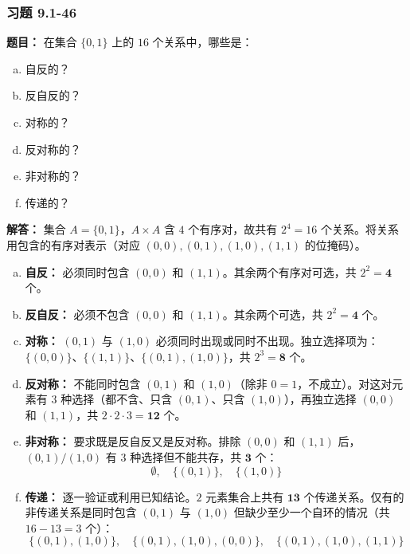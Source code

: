 \documentclass[11pt,UTF8]{article}
\begin{document}
\subsubsection*{习题 9.1-46}
\textbf{题目：} 在集合 $\{0, 1\}$ 上的 $16$ 个关系中，哪些是：
\begin{enumerate}[a)]
    \item 自反的？ \item 反自反的？ \item 对称的？ \item 反对称的？ \item 非对称的？ \item 传递的？
\end{enumerate}

\textbf{解答：}
集合 $A=\{0,1\}$，$A \times A$ 含 $4$ 个有序对，故共有 $2^4=16$ 个关系。将关系用包含的有序对表示（对应 $(0,0),(0,1),(1,0),(1,1)$ 的位掩码）。

\begin{enumerate}[a)]
    \item \textbf{自反：} 必须同时包含 $(0,0)$ 和 $(1,1)$。其余两个有序对可选，共 $2^2 = \mathbf{4}$ 个。
    
    \item \textbf{反自反：} 必须不包含 $(0,0)$ 和 $(1,1)$。其余两个可选，共 $2^2 = \mathbf{4}$ 个。
    
    \item \textbf{对称：} $(0,1)$ 与 $(1,0)$ 必须同时出现或同时不出现。独立选择项为：$\{(0,0)\}$、$\{(1,1)\}$、$\{(0,1),(1,0)\}$，共 $2^3 = \mathbf{8}$ 个。
    
    \item \textbf{反对称：} 不能同时包含 $(0,1)$ 和 $(1,0)$（除非 $0=1$，不成立）。对这对元素有 $3$ 种选择（都不含、只含 $(0,1)$、只含 $(1,0)$），再独立选择 $(0,0)$ 和 $(1,1)$，共 $2 \cdot 2 \cdot 3 = \mathbf{12}$ 个。
    
    \item \textbf{非对称：} 要求既是反自反又是反对称。排除 $(0,0)$ 和 $(1,1)$ 后，$(0,1)/(1,0)$ 有 $3$ 种选择但不能共存，共 $\mathbf{3}$ 个：
    \[ \emptyset,\quad \{(0,1)\},\quad \{(1,0)\} \]
    
    \item \textbf{传递：} 逐一验证或利用已知结论。$2$ 元素集合上共有 $\mathbf{13}$ 个传递关系。仅有的非传递关系是同时包含 $(0,1)$ 与 $(1,0)$ 但缺少至少一个自环的情况（共 $16-13=3$ 个）：
    \[ \{(0,1),(1,0)\},\quad \{(0,1),(1,0),(0,0)\},\quad \{(0,1),(1,0),(1,1)\} \]
\end{enumerate}
\end{document}
